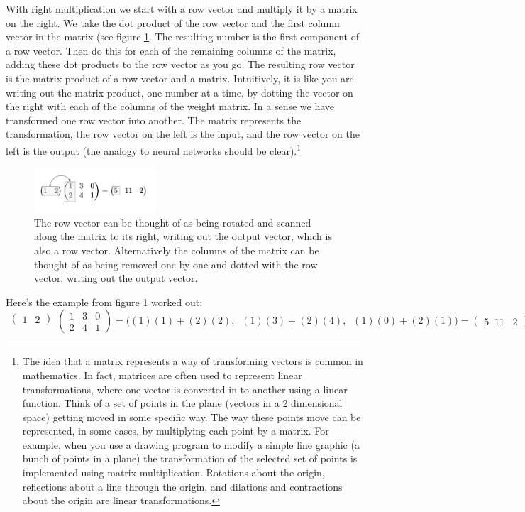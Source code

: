 With right multiplication we start with a row vector and multiply it by a matrix on the right. We take the dot product of the row vector and the first column vector in the matrix (see figure \ref{vectorMatrixProduct}. The resulting number is the first component of a row vector. Then do this for each of the remaining columns of the matrix, adding these dot products to the row vector as you go. The resulting row vector is the matrix product of a row vector and a matrix. Intuitively, it is like you are writing out the matrix product, one number at a time, by dotting the vector on the right with each of the columns of the weight matrix.  In a sense we have transformed one row vector into another. The matrix represents the transformation, the row vector on the left is the input, and the row vector on the left is the output (the analogy to neural networks should be clear).\footnote{The idea that a matrix represents a way of transforming vectors is common in mathematics. In fact, matrices are often used to represent linear transformations, where one vector is converted in to another using a linear function. Think of a set of points in the plane (vectors in a 2 dimensional space) getting moved in some specific way. The way these points move can be represented, in some cases, by multiplying each point by a matrix. For example, when you use a drawing program to modify a simple line graphic (a bunch of points in a plane) the transformation of the selected set of points is implemented using matrix multiplication. Rotations about the origin, reflections about a line through the origin, and dilations and contractions about the origin are linear transformations.}

\begin{figure}[h]
\centering
\includegraphics[width=0.4\textwidth]{images/vectorMatrixProduct.png}
\caption[Jeff Yoshimi.]{The row vector can be thought of as being rotated and scanned along the matrix to its right, writing out the output vector, which is also a row vector. Alternatively the columns of the matrix can be thought of as being removed one by one and dotted with the row vector, writing out the output vector.}
\label{vectorMatrixProduct}
\end{figure}

Here's the example from figure \ref{vectorMatrixProduct} worked out:
\[
  \begin{matrix}\begin{pmatrix}1 & 2\end{pmatrix}\\\mbox{}\end{matrix}
  \begin{pmatrix} 1 & 3 & 0 \\ 2 & 4 & 1 \end{pmatrix} 
  =
  \bigg( (1)(1) + (2)(2) ,\;\; (1)(3) + (2)(4) ,\;\; (1)(0)+ (2)(1) \bigg)
  =
  \begin{pmatrix}  5 \;\; 11 \;\;\; 2  \end{pmatrix}
\]
\vspace*{.1cm} 


